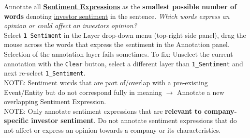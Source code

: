 \begin{steps}[leftmargin=*]
    \item \label{step:annotatesentiment} Annotate all \hyperlink{sec:sentimentexpressiondefinition}{\textbf{Sentiment Expressions}} as the \textbf{smallest possible number of words} denoting \hyperlink{sec:sentimentdef}{investor sentiment} in the sentence. %
    \textit{Which words express an opinion or could affect an investors opinion?}\\
    \textcolor{OliveGreen}{Select \texttt{1\_Sentiment} in the Layer drop-down menu (top-right side panel), drag the mouse across the words that express the sentiment in the Annotation panel. \footnotesize{Selection of the annotation layer fails sometimes. To fix: Unselect the current annotation with the \texttt{Clear} button, select a different layer than \texttt{1\_Sentiment} and next re-select \texttt{1\_Sentiment}.}}\\
    \textcolor{BrickRed}{NOTE: Sentiment words that are part of/overlap with a pre-existing Event/Entity but do not correspond fully in meaning $\rightarrow$ Annotate a new overlapping Sentiment Expression.}\\
    \textcolor{BrickRed}{NOTE: Only annotate sentiment expressions that are \textbf{relevant to company-specific investor sentiment}. Do not annotate sentiment expressions that do not affect or express an opinion towards a company or its characteristics.}\\
    

\end{steps}
